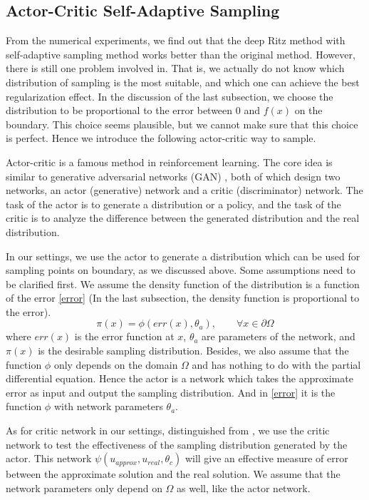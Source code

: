 \documentclass{article}
\begin{document}
\subsection{Actor-Critic Self-Adaptive Sampling}
\par From the numerical experiments, we find out that the deep Ritz method with self-adaptive sampling method works better than the original method. However, there is still one problem involved in. That is, we actually do not know which distribution of sampling is the most suitable, and which one can achieve the best regularization effect. In the discussion of the last subsection, we choose the distribution to be proportional to the error between $0$ and $f(x)$ on the boundary. This choice seems plausible, but we cannot make sure that this choice is perfect. Hence we introduce the following actor-critic way to sample.
\par Actor-critic \cite{konda2000actor} is a famous method in reinforcement learning. The core idea is similar to generative adversarial networks (GAN) \cite{goodfellow2014generative}, both of which design two networks, an actor (generative) network and a critic (discriminator) network. The task of the actor is to generate a distribution or a policy, and the task of the critic is to analyze the difference between the generated distribution and the real distribution.
\par In our settings, we use the actor to generate a distribution which can be used for sampling points on boundary, as we discussed above. Some assumptions need to be clarified first. We assume the density function of the distribution is a function of the error \eqref{error} (In the last subsection, the density function is proportional to the error). 
\begin{equation}\label{error}
	\pi(x) = \phi(err(x), \theta_{a}),\qquad\forall x\in\partial\Omega
\end{equation}
where $err(x)$ is the error function at $x$, $\theta_{a}$ are parameters of the network, and $\pi(x)$ is the desirable sampling distribution. Besides, we also assume that the function $\phi$ only depends on the domain $\Omega$ and has nothing to do with the partial differential equation. Hence the actor is a network which takes the approximate error as input and output the sampling distribution. And in \eqref{error} it is the function $\phi$ with network parameters $\theta_{a}$. 
\par As for critic network in our settings, distinguished from \cite{goodfellow2014generative} \cite{konda2000actor}, we use the critic network to test the effectiveness of the sampling distribution generated by the actor. This network $\psi(u_{approx}, u_{real}, \theta_{c})$ will give an effective measure of error between the approximate solution and the real solution. We assume that the network parameters only depend on $\Omega$ as well, like the actor network.
\end{document}
